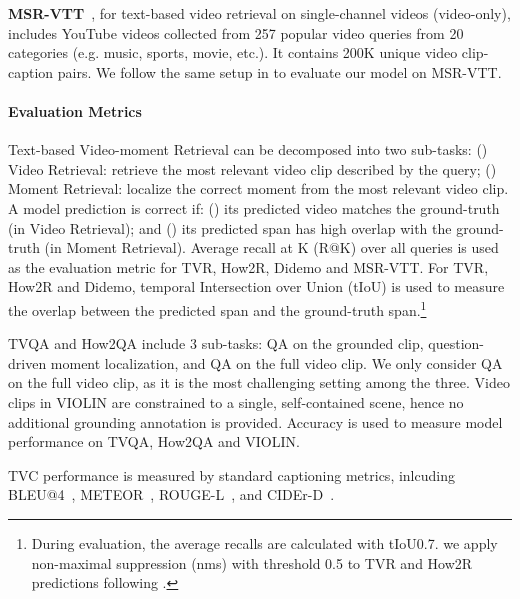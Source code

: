 \documentclass[11pt,a4paper]{article}
\begin{document}
\vspace{5pt}
\noindent \textbf{MSR-VTT}~\citep{xu2016msr-vtt}, for text-based video retrieval on single-channel videos (video-only), includes YouTube videos collected from 257 popular video queries from 20 categories (e.g. music, sports, movie, etc.). It contains 200K unique video clip-caption pairs. We follow the same setup in \citet{yu2018joint} to evaluate our model on MSR-VTT.

\vspace{5pt}
\paragraph{Evaluation Metrics} Text-based Video-moment Retrieval can be decomposed into two sub-tasks: () Video Retrieval: retrieve the most relevant video clip described by the query; () Moment Retrieval: localize the correct moment from the most relevant video clip. A model prediction is correct if: () its predicted video matches the ground-truth (in Video Retrieval); and () its predicted span has high overlap with the ground-truth (in Moment Retrieval). Average recall at K (R@K) over all queries is used as the evaluation metric for TVR, How2R, Didemo and MSR-VTT. For TVR, How2R and Didemo, temporal Intersection over Union (tIoU) is used to measure the overlap between the predicted span and the ground-truth span.\footnote{\label{note:tvr_eval}During evaluation, the average recalls are calculated with tIoU0.7. we apply non-maximal suppression (nms) with threshold 0.5 to  TVR and How2R predictions following \citet{lei2020tvr}. } 

TVQA and How2QA include 3 sub-tasks: QA on the grounded clip, question-driven moment localization, and QA on the full video clip. We only consider QA on the full video clip, as it is the most challenging setting among the three. Video clips in VIOLIN are constrained to a single, self-contained scene, hence no additional grounding annotation is provided. Accuracy is used to measure model performance on TVQA, How2QA and VIOLIN.

TVC performance is measured by standard captioning
metrics, inlcuding BLEU@4~\citep{papineni2002bleu}, METEOR~\citep{denkowski2014meteor}, ROUGE-L~\citep{linrouge}, and CIDEr-D~\citep{vedantam2015cider}. 
\end{document}
